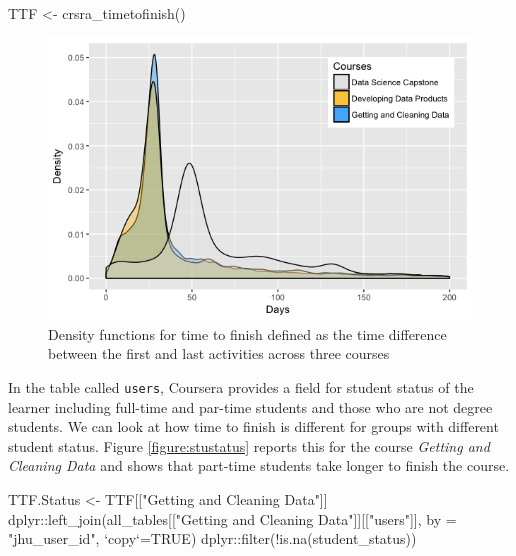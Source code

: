 \begin{Schunk}
\begin{Sinput}
TTF <- crsra_timetofinish() %
\end{Sinput}
\end{Schunk}

\begin{figure}[htbp]
    \centering
    \includegraphics[scale=0.5]{timetofinish}
    \caption{Density functions for time to finish defined as the time difference between the first and last activities across three courses}
    \label{figure:timetofinish}
\end{figure}

In the table called \texttt{users}, Coursera provides a field for
student status of the learner including full-time and par-time students
and those who are not degree students. We can look at how time to finish
is different for groups with different student status. Figure
\ref{figure:stustatus} reports this for the course \emph{Getting and
Cleaning Data} and shows that part-time students take longer to finish
the course.

\begin{Schunk}
\begin{Sinput}
TTF.Status <- TTF[["Getting and Cleaning Data"]] %
  dplyr::left_join(all_tables[["Getting and Cleaning Data"]][["users"]], by = "jhu_user_id", `copy`=TRUE) %
  dplyr::filter(!is.na(student_status))
\end{Sinput}
\end{Schunk}

